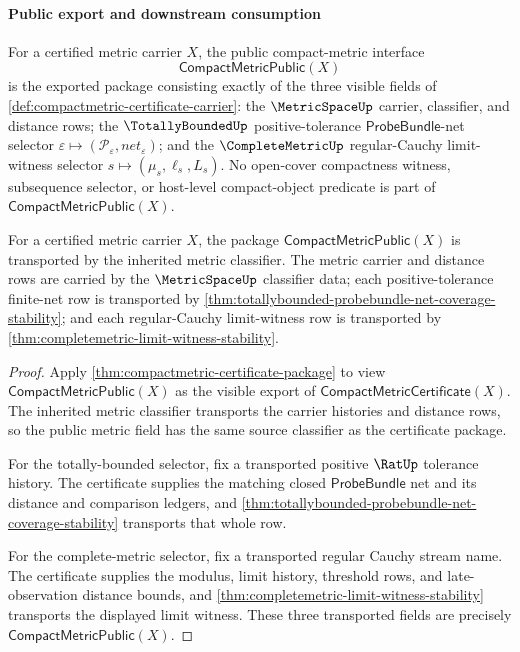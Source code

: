\paragraph{Public export and downstream consumption}

\begin{definition}
\label{def:compactmetric-public-interface}
For a certified metric carrier $X$, the public compact-metric interface
$$
\mathsf{CompactMetricPublic}(X)
$$
is the exported package consisting exactly of the three visible fields of
\autoref{def:compactmetric-certificate-carrier}: the $\MetricSpaceUp$
carrier, classifier, and distance rows; the $\TotallyBoundedUp$
positive-tolerance $\mathsf{ProbeBundle}$-net selector
$\varepsilon \mapsto (\mathcal{P}_{\varepsilon},net_{\varepsilon})$; and the
$\CompleteMetricUp$ regular-Cauchy limit-witness selector
$s \mapsto (\mu_s,\ell_s,L_s)$. No open-cover compactness witness, subsequence
selector, or host-level compact-object predicate is part of
$\mathsf{CompactMetricPublic}(X)$.
\end{definition}

\begin{theorem}
\label{thm:compactmetric-public-interface-stability}
For a certified metric carrier $X$, the package
$\mathsf{CompactMetricPublic}(X)$ is transported by the inherited metric
classifier. The metric carrier and distance rows are carried by the
$\MetricSpaceUp$ classifier data; each positive-tolerance finite-net row is
transported by
\autoref{thm:totallybounded-probebundle-net-coverage-stability}; and each
regular-Cauchy limit-witness row is transported by
\autoref{thm:completemetric-limit-witness-stability}.
\end{theorem}
\begin{proof}
Apply \autoref{thm:compactmetric-certificate-package} to view
$\mathsf{CompactMetricPublic}(X)$ as the visible export of
$\mathsf{CompactMetricCertificate}(X)$. The inherited metric classifier
transports the carrier histories and distance rows, so the public metric field
has the same source classifier as the certificate package.

For the totally-bounded selector, fix a transported positive $\RatUp$
tolerance history. The certificate supplies the matching closed
$\mathsf{ProbeBundle}$ net and its distance and comparison ledgers, and
\autoref{thm:totallybounded-probebundle-net-coverage-stability} transports
that whole row.

For the complete-metric selector, fix a transported regular Cauchy stream name.
The certificate supplies the modulus, limit history, threshold rows, and
late-observation distance bounds, and
\autoref{thm:completemetric-limit-witness-stability} transports the displayed
limit witness. These three transported fields are precisely
$\mathsf{CompactMetricPublic}(X)$.
\end{proof}

